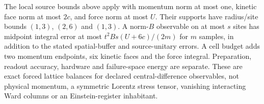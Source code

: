 The local source bounds above apply with momentum norm at most one,
kinetic face norm at most $2c$, and force norm at most $U$.  Their supports
have radius/site bounds $(1,3)$, $(2,6)$ and $(1,3)$.  A norm-$B$
observable on at most $s$ sites has midpoint integral error at most
$t^2Bs(U+6c)/(2m)$ for $m$ samples, in addition to the stated spatial-buffer
and source-unitary errors.  A cell budget adds two momentum endpoints,
six kinetic faces and the force integral.  Preparation, readout accuracy,
hardware and failure-space energy are separate.  These are exact
forced lattice balances for declared central-difference observables, not
physical momentum, a symmetric Lorentz stress tensor, vanishing interacting
Ward columns or an Einstein-register inhabitant.
